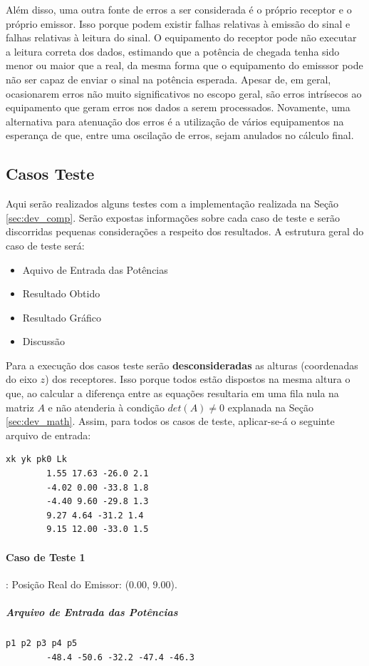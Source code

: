 	Além disso, uma outra fonte de erros a ser considerada é o próprio receptor e o próprio emissor. Isso porque podem existir falhas relativas à
	emissão do sinal e falhas relativas à leitura do sinal. O equipamento do receptor pode não executar a leitura correta dos dados, estimando
	que a potência de chegada tenha sido menor ou maior que a real, da mesma forma que o equipamento do emisssor pode não ser capaz de enviar o sinal na
	potência esperada. Apesar de, em geral, ocasionarem erros não muito significativos no escopo geral, são erros intrísecos ao equipamento que geram
	erros nos dados a serem processados. Novamente, uma alternativa para atenuação dos erros é a utilização de vários equipamentos na esperança de que,
	entre uma oscilação de erros, sejam anulados no cálculo final.

	\subsection{Casos Teste}
	Aqui serão realizados alguns testes com a implementação realizada na Seção \ref{sec:dev_comp}. Serão expostas informações sobre cada caso de teste
	e serão discorridas pequenas considerações a respeito dos resultados. A estrutura geral do caso de teste será:
	\begin{itemize}
		\item Aquivo de Entrada das Potências
		\item Resultado Obtido
		\item Resultado Gráfico
		\item Discussão
	\end{itemize}

	Para a execução dos casos teste serão \textbf{desconsideradas} as alturas (coordenadas do eixo $z$) dos receptores. Isso porque todos estão
	dispostos na mesma altura o que, ao calcular a diferença entre as equações resultaria em uma fila nula na matriz $A$ e não atenderia à condição
	$det(A)\neq0$ explanada na Seção \ref{sec:dev_math}. Assim, para todos os casos de teste, aplicar-se-á o seguinte arquivo de entrada:
	\begin{Verbatim}[fontsize=\footnotesize]
		xk yk pk0 Lk
		1.55 17.63 -26.0 2.1
		-4.02 0.00 -33.8 1.8
		-4.40 9.60 -29.8 1.3
		9.27 4.64 -31.2 1.4
		9.15 12.00 -33.0 1.5
	\end{Verbatim}

	\paragraph{Caso de Teste 1}: Posição Real do Emissor: ($0.00$, $9.00$).
	\subparagraph{Arquivo de Entrada das Potências}
	\begin{Verbatim}[fontsize=\footnotesize]
		p1 p2 p3 p4 p5
		-48.4 -50.6 -32.2 -47.4 -46.3
	\end{Verbatim}

